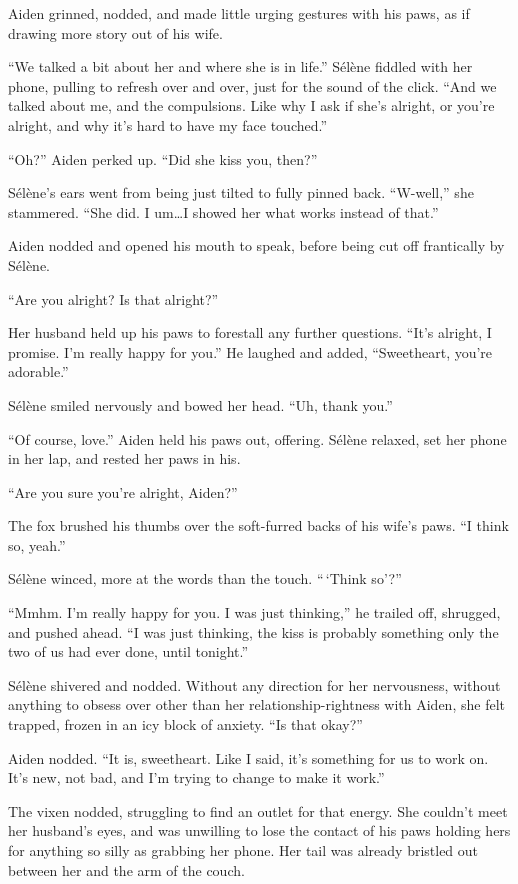 Aiden grinned, nodded, and made little urging gestures with his paws, as if drawing more story out of his wife.

``We talked a bit about her and where she is in life.'' Sélène fiddled with her phone, pulling to refresh over and over, just for the sound of the click. ``And we talked about me, and the compulsions. Like why I ask if she's alright, or you're alright, and why it's hard to have my face touched.''

``Oh?'' Aiden perked up. ``Did she kiss you, then?''

Sélène's ears went from being just tilted to fully pinned back. ``W-well,'' she stammered. ``She did. I um\ldots{}I showed her what works instead of that.''

Aiden nodded and opened his mouth to speak, before being cut off frantically by Sélène.

``Are you alright? Is that alright?''

Her husband held up his paws to forestall any further questions. ``It's alright, I promise. I'm really happy for you.'' He laughed and added, ``Sweetheart, you're adorable.''

Sélène smiled nervously and bowed her head. ``Uh, thank you.''

``Of course, love.'' Aiden held his paws out, offering. Sélène relaxed, set her phone in her lap, and rested her paws in his.

``Are you sure you're alright, Aiden?''

The fox brushed his thumbs over the soft-furred backs of his wife's paws. ``I think so, yeah.''

Sélène winced, more at the words than the touch. ``\,`Think so'?''

``Mmhm. I'm really happy for you. I was just thinking,'' he trailed off, shrugged, and pushed ahead. ``I was just thinking, the kiss is probably something only the two of us had ever done, until tonight.''

Sélène shivered and nodded. Without any direction for her nervousness, without anything to obsess over other than her relationship-rightness with Aiden, she felt trapped, frozen in an icy block of anxiety. ``Is that okay?''

Aiden nodded. ``It is, sweetheart. Like I said, it's something for us to work on. It's new, not bad, and I'm trying to change to make it work.''

The vixen nodded, struggling to find an outlet for that energy. She couldn't meet her husband's eyes, and was unwilling to lose the contact of his paws holding hers for anything so silly as grabbing her phone. Her tail was already bristled out between her and the arm of the couch.


